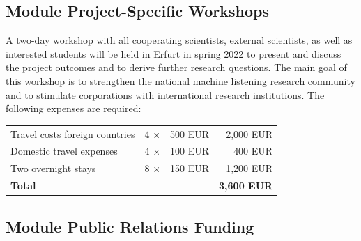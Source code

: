 \documentclass[11pt]{article}
\newcommand{\todo}[1]{\textcolor{red}{#1}}
\begin{document}
\subsection{Module Project-Specific Workshops}

A two-day workshop with all cooperating scientists, external scientists, as well as interested students will be held in Erfurt in spring 2022 to present and discuss the project outcomes and to derive further research questions. The main goal of this workshop is to strengthen the national machine listening research community and to stimulate corporations with international research institutions.  
The following expenses are required:

\begin{table}[h!]
\centering
\begin{tabular}{lrrr}
 Travel costs foreign countries & 4 $\times$ & 500 EUR & 2,000 EUR  \\
  Domestic travel expenses & 4 $\times$ & 100 EUR & 400 EUR  \\
 Two overnight stays & 8 $\times$ & 150 EUR & 1,200 EUR  \\
 \hline
 \textbf{Total} &  &  &  \textbf{3,600 EUR}  \\
\end{tabular}
\end{table}


\subsection{Module Public Relations Funding}


\end{document}
